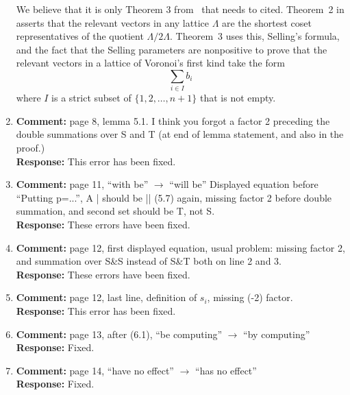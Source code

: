 \documentclass[a4paper,10pt]{article}
\begin{document}
\begin{enumerate}
We believe that it is only Theorem 3 from~\cite{ConwaySloane1992_voronoi_lattice_3d_obtuse_superbases} that needs to cited.  Theorem~2 in \cite{ConwaySloane1992_voronoi_lattice_3d_obtuse_superbases} asserts that the relevant vectors in any lattice $\Lambda$ are the shortest coset representatives of the quotient $\Lambda/2\Lambda$.  Theorem~3 uses this, Selling's formula, and the fact that the Selling parameters are nonpositive to prove that the relevant vectors in a lattice of Voronoi's first kind take the form
\[
\sum_{i \in I} b_i
\]
where $I$ is a strict subset of $\{1, 2, \dots, n+1\}$ that is not empty.


\item\textbf{Comment:}  
page 8, lemma 5.1. I think you forgot a factor 2 preceding the double summations over S and T (at end of lemma statement, and also in the proof.) 
\\\textbf{Response:}
This error has been fixed.

\item\textbf{Comment:}  
page 11, ``with be'' $\to$ ``will be'' Displayed equation before ``Putting p=...'', A | should be || (5.7) again, missing factor 2 before double summation, and second set should be T, not S. 
\\\textbf{Response:}
These errors have been fixed.

\item\textbf{Comment:}  
page 12, first displayed equation, usual problem: missing factor 2, and summation over S\&S instead of S\&T both on line 2 and 3. 
\\\textbf{Response:}
These errors have been fixed.

\item\textbf{Comment:}  
page 12, last line, definition of $s_i$, missing (-2) factor. 
\\\textbf{Response:}
This error has been fixed.

\item\textbf{Comment:}  
page 13, after (6.1), ``be computing'' $\to$ ``by computing'' 
\\\textbf{Response:}
Fixed.

\item\textbf{Comment:}  
page 14, ``have no effect'' $\to$ ``has no effect'' 
\\\textbf{Response:}
Fixed.


\end{enumerate}
\end{document}
